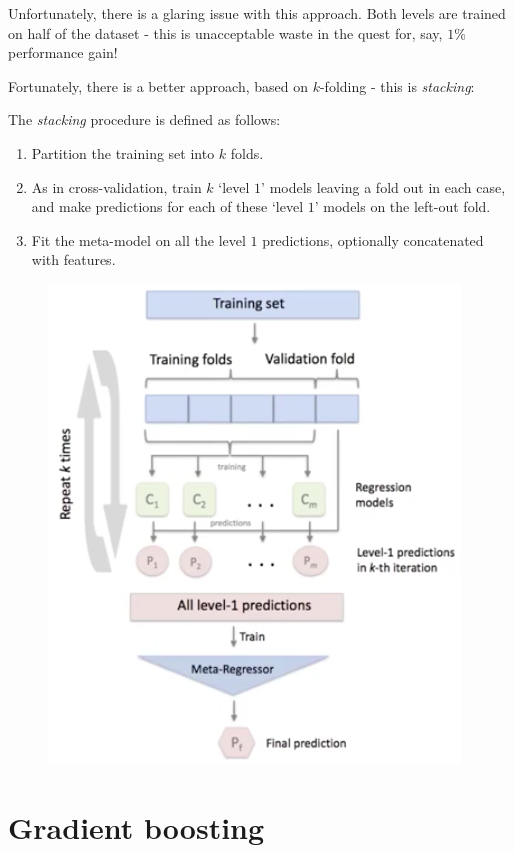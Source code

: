Unfortunately, there is a glaring issue with this approach. Both levels are trained on half of the dataset - this is unacceptable waste in the quest for, say, $1$\% performance gain!



\newpage
Fortunately, there is a better approach, based on $k$-folding - this is \textit{stacking}:
\begin{framedef}
The \textit{stacking} procedure is defined as follows:
\begin{enumerate}[label = (\arabic*)]
\item Partition the training set into $k$ folds.
\item As in cross-validation, train $k$ `level $1$' models leaving a fold out in each case, and make predictions for each of these `level $1$' models on the left-out fold.
\item Fit the meta-model on all the level $1$ predictions, optionally concatenated with features.
\end{enumerate}
\begin{figure}[H]
\centering
\includegraphics[scale=0.6]{stacking2.png}
\end{figure}
\end{framedef}




\newpage
\section{Gradient boosting}

